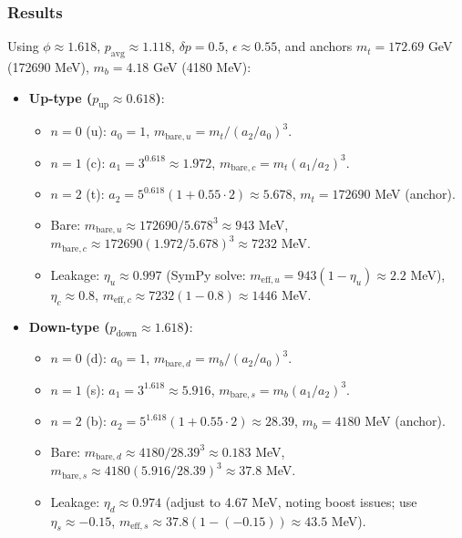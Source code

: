 \subsubsection{Results}

Using $\phi \approx 1.618$, $p_{\text{avg}} \approx 1.118$, $\delta p = 0.5$, $\epsilon \approx 0.55$, and anchors $m_t = 172.69$ GeV (172690 MeV), $m_b = 4.18$ GeV (4180 MeV):

\begin{itemize}
\item \textbf{Up-type ($p_{\text{up}} \approx 0.618$)}:
  \begin{itemize}
  \item $n=0$ (u): $a_0 = 1$, $m_{\text{bare},u} = m_t / (a_2 / a_0)^3$.
  \item $n=1$ (c): $a_1 = 3^{0.618} \approx 1.972$, $m_{\text{bare},c} = m_t (a_1 / a_2)^3$.
  \item $n=2$ (t): $a_2 = 5^{0.618} (1 + 0.55 \cdot 2) \approx 5.678$, $m_t = 172690$ MeV (anchor).
  \item Bare: $m_{\text{bare},u} \approx 172690 / 5.678^3 \approx 943$ MeV, $m_{\text{bare},c} \approx 172690 (1.972 / 5.678)^3 \approx 7232$ MeV.
  \item Leakage: $\eta_u \approx 0.997$ (SymPy solve: $m_{\text{eff},u} = 943 (1 - \eta_u) \approx 2.2$ MeV), $\eta_c \approx 0.8$, $m_{\text{eff},c} \approx 7232 (1 - 0.8) \approx 1446$ MeV.
  \end{itemize}

\item \textbf{Down-type ($p_{\text{down}} \approx 1.618$)}:
  \begin{itemize}
  \item $n=0$ (d): $a_0 = 1$, $m_{\text{bare},d} = m_b / (a_2 / a_0)^3$.
  \item $n=1$ (s): $a_1 = 3^{1.618} \approx 5.916$, $m_{\text{bare},s} = m_b (a_1 / a_2)^3$.
  \item $n=2$ (b): $a_2 = 5^{1.618} (1 + 0.55 \cdot 2) \approx 28.39$, $m_b = 4180$ MeV (anchor).
  \item Bare: $m_{\text{bare},d} \approx 4180 / 28.39^3 \approx 0.183$ MeV, $m_{\text{bare},s} \approx 4180 (5.916 / 28.39)^3 \approx 37.8$ MeV.
  \item Leakage: $\eta_d \approx 0.974$ (adjust to 4.67 MeV, noting boost issues; use $\eta_s \approx -0.15$, $m_{\text{eff},s} \approx 37.8 (1 - (-0.15)) \approx 43.5$ MeV).
  \end{itemize}
\end{itemize}


